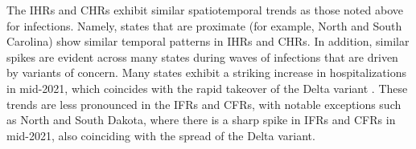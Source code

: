The IHRs and CHRs exhibit similar spatiotemporal trends as those noted above for
infections. Namely, states that are proximate (for example, North and South
Carolina) show similar temporal patterns in IHRs and CHRs. In addition, similar
spikes are evident across many states during waves of infections that are driven
by variants of concern. Many states exhibit a striking increase in
hospitalizations in mid-2021, which coincides with the rapid takeover of the
Delta variant \citep{hodcroft2021covariants}. These trends are less pronounced
in the IFRs and CFRs, with notable exceptions such as North and South Dakota,
where there is a sharp spike in IFRs and CFRs in mid-2021, also coinciding with
the spread of the Delta variant.






